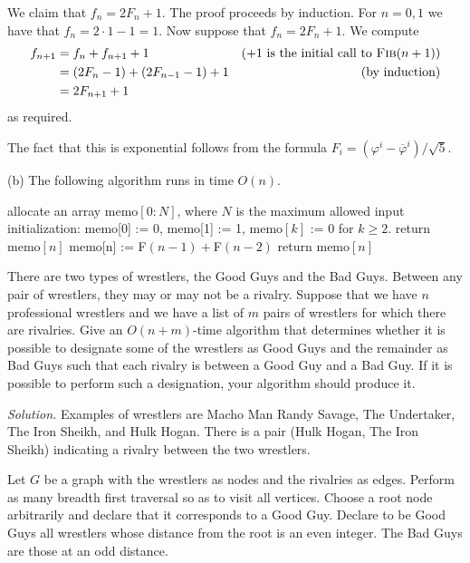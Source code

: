 \documentclass[10pt,reqno]{amsart}
\begin{document}
\begin{outline}[enumerate]
We claim that $f_n = 2F_n + 1$. The proof proceeds by induction. For $n=0,1$
we have that $f_n = 2\cdot 1 - 1 = 1$. Now suppose that $f_n = 2F_n + 1$. We
compute
\begin{align*}
    f_{n+1} & = f_{n}+ f_{n+1} + 1 & (+1 \text{ is the initial call to \textsc{Fib}}(n+1)) \\
    & = (2F_n -1) + (2F_{n-1} -1) + 1 & (\text{by induction})\\
    & = 2F_{n+1}+1
\end{align*} as required.

The fact that this is exponential follows from the formula $F_i = (\varphi^i -
\overline{\varphi}^i)/\sqrt{5}$.

(b)  The following algorithm runs in time $O(n)$.

\medskip
\begin{algorithmic}[1]
    \State allocate an array memo$[0:N]$, where $N$ is the maximum allowed input
    \State initialization: memo[0] := 0, memo[1] := 1, memo$[k]$ := 0 for $k \ge 2.$
    \State return memo$[n]$
    \EndIf
    \State memo[n] := \textsc{F}$(n-1)+$\textsc{F}$(n-2)$
    \State return memo$[n]$
    \EndProcedure
\end{algorithmic}
\medskip

\medskip

\1 There are two types of wrestlers, the Good Guys and the Bad Guys. Between
any pair of wrestlers, they may or may not be a rivalry. Suppose that we have
$n$ professional wrestlers and we have a list of $m$ pairs of wrestlers for
which there are rivalries. Give an $O(n+m)$-time algorithm that determines
whether it is possible to designate some of the wrestlers as Good Guys and the
remainder as Bad Guys such that each rivalry is between a Good Guy and a Bad
Guy. If it is possible to perform such a designation, your algorithm should
produce it.

\medskip
\noindent \emph{Solution.} Examples of wrestlers are Macho Man Randy Savage,
The Undertaker, The Iron Sheikh, and Hulk Hogan. There is a pair (Hulk Hogan,
The Iron Sheikh) indicating a rivalry between the two wrestlers.

Let $G$ be a graph with the wrestlers as nodes and the rivalries as edges.
Perform as many breadth first traversal so as to visit all vertices. Choose a
root node arbitrarily and declare that it corresponds to a Good Guy. Declare to
be Good Guys all wrestlers whose distance from the root is an even integer. The
Bad Guys are those at an odd distance.


\end{outline}
\end{document}
